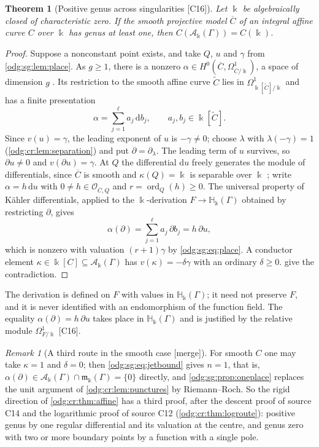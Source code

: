 \documentclass[11pt,oneside]{article}
\numberwithin{equation}{section}
\newtheorem{theorem}{Theorem}[section]
\theoremstyle{definition}
\theoremstyle{remark}
\newtheorem{remark}[remark]{Remark}
\newcommand{\src}[1]{\textup{\textsf{\small[#1]}}}
\newcommand{\mergetag}{\textup{\textsf{\small[merge]}}}
\newcommand{\crH}{\mathbb H_\Bbbk(\Gamma)}
\newcommand{\crA}{\mathcal A_\Bbbk(\Gamma)}
\newcommand{\crm}{\mathfrak m_\Bbbk(\Gamma)}
\newcommand{\dif}{\mathrm d}
\begin{document}
\begin{theorem}[Positive genus across singularities \src{C16}]\label{odg:sg:thm:genus}
Let $\Bbbk$ be algebraically closed of characteristic zero. If the smooth projective model
$\overline C$ of an integral affine curve $C$ over $\Bbbk$ has genus at least one, then
$C(\crA)=C(\Bbbk)$.
\end{theorem}
\begin{proof}
Suppose a nonconstant point exists, and take $Q$, $u$ and $\gamma$ from
\cref{odg:sg:lem:place}. As $g\ge1$, there is a nonzero
$\alpha\in H^0(\overline C,\Omega^1_{\overline C/\Bbbk})$, a space of dimension $g$
\cite{StacksRR}. Its restriction to the smooth affine curve $\widetilde C$ lies in
$\Omega^1_{\Bbbk[\widetilde C]/\Bbbk}$ and has a finite presentation
\begin{equation}\label{odg:sg:eq:alpha}
 \alpha=\sum_{j=1}^{\ell}a_j\,\dif b_j,\qquad a_j,b_j\in\Bbbk[\widetilde C].
\end{equation}
Since $v(u)=\gamma$, the leading exponent of $u$ is $-\gamma\ne0$; choose $\lambda$ with
$\lambda(-\gamma)=1$ (\cref{odg:cr:lem:separation}) and put $\partial=\partial_\lambda$. The
leading term of $u$ survives, so $\partial u\ne0$ and $v(\partial u)=\gamma$. At $Q$ the
differential $\dif u$ freely generates the module of differentials, since $\overline C$ is
smooth and $\kappa(Q)=\Bbbk$ is separable over $\Bbbk$
\cite[Lemma 53.12.3]{StacksRH}; write
$\alpha=h\,\dif u$ with $0\ne h\in\mathcal O_{\overline C,Q}$ and $r=\operatorname{ord}_Q(h)\ge0$.
The universal property of K\"ahler differentials, applied to the $\Bbbk$-derivation
$F\to\crH$ obtained by restricting $\partial$, gives
\[
 \alpha(\partial)=\sum_{j=1}^{\ell}a_j\,\partial b_j=h\,\partial u ,
\]
which is nonzero with valuation $(r+1)\gamma$ by \eqref{odg:sg:eq:place}. A conductor
element $\kappa\in\Bbbk[C]\subseteq\crA$ has $v(\kappa)=-\delta\gamma$ with an ordinary
$\delta\ge0$.  give the contradiction.
\end{proof}

The derivation is defined on $F$ with values in $\crH$; it need not preserve $F$, and it
is never identified with an endomorphism of the function field. The equality
$\alpha(\partial)=h\,\partial u$ takes place in $\crH$ and is justified by the relative
module $\Omega^1_{F/\Bbbk}$ \src{C16}.

\begin{remark}[A third route in the smooth case \mergetag]\label{odg:sg:rem:thirdroute}
For smooth $C$ one may take $\kappa=1$ and $\delta=0$; then \eqref{odg:sg:eq:jetbound} gives $n=1$, that
is, $\alpha(\partial)\in\crA\cap\crm=\{0\}$ directly, and
\cref{odg:sg:prop:oneplace} replaces the unit argument of \cref{odg:cr:lem:punctures}
by Riemann--Roch. So the rigid direction of \cref{odg:cr:thm:affine} has a third proof,
after the descent proof of source C14 and the logarithmic proof of source C12
(\cref{odg:cr:thm:logroute}): positive genus by one regular differential and its
valuation at the centre, and genus zero with two or more boundary points by a function
with a single pole.
\end{remark}
\end{document}
